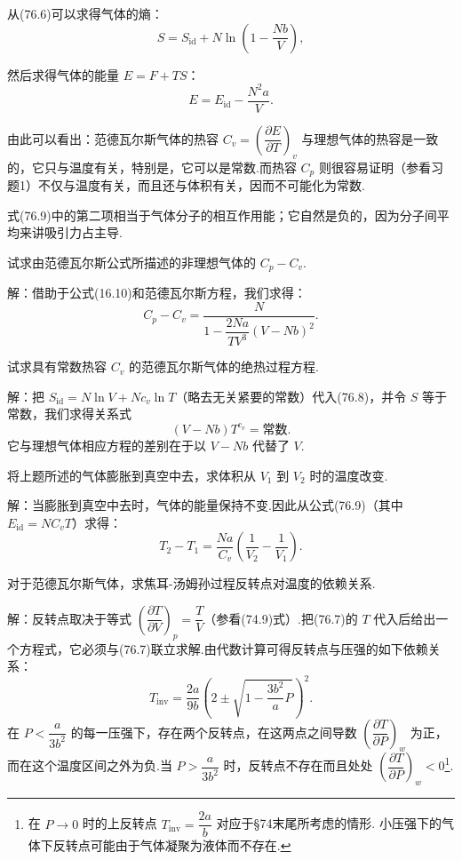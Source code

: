 从(76.6)可以求得气体的熵：
\begin{equation}
  S=S_{\mathrm{id}}+N\ln\left(1-\frac{Nb}{V}\right),
\end{equation}

然后求得气体的能量 $E=F+TS$：
\begin{equation}
  E=E_{\mathrm{id}}-\frac{N^2a}{V}.
\end{equation}

由此可以看出：范德瓦尔斯气体的热容 $C_v=\left(\dfrac{\partial E}{\partial T}\right)_v$ 与理想气体的热容是一致的，它只与温度有关，特别是，它可以是常数.而热容 $C_p$ 则很容易证明（参看习题1）不仅与温度有关，而且还与体积有关，因而不可能化为常数.

式(76.9)中的第二项相当于气体分子的相互作用能；它自然是负的，因为分子间平均来讲吸引力占主导.

\begin{xiti}

\quad 试求由范德瓦尔斯公式所描述的非理想气体的 $C_p-C_v$.

解：借助于公式(16.10)和范德瓦尔斯方程，我们求得：
\begin{equation*}
  C_p-C_v=\frac{N}{1-\dfrac{2Na}{TV^3}(V-Nb)^2}.
\end{equation*}

\quad 试求具有常数热容 $C_v$ 的范德瓦尔斯气体的绝热过程方程.

解：把 $S_{\mathrm{id}}=N\ln V+Nc_v\ln T$（略去无关紧要的常数）代入(76.8)，并令 $S$ 等于常数，我们求得关系式
\begin{equation*}
  (V-Nb)T^{c_v}=\text{常数}.
\end{equation*}
它与理想气体相应方程的差别在于以 $V-Nb$ 代替了 $V$.

\quad 将上题所述的气体膨胀到真空中去，求体积从 $V_1$ 到 $V_2$ 时的温度改变.

解：当膨胀到真空中去时，气体的能量保持不变.因此从公式(76.9)（其中 $E_{\mathrm{id}}=NC_vT$）求得：
\begin{equation*}
  T_2-T_1=\frac{Na}{C_v}\left(\frac{1}{V_2}-\frac{1}{V_1}\right).
\end{equation*}

\quad 对于范德瓦尔斯气体，求焦耳-汤姆孙过程反转点对温度的依赖关系.

解：反转点取决于等式 $\left(\dfrac{\partial T}{\partial V}\right)_p=\dfrac{T}{V}$（参看(74.9)式）.把(76.7)的 $T$ 代入后给出一个方程式，它必须与(76.7)联立求解.由代数计算可得反转点与压强的如下依赖关系：
\begin{equation*}
  T_{\mathrm{inv}}=\frac{2a}{9b}\left(2\pm\sqrt{1-\frac{3b^2}{a}P}\right)^2.
\end{equation*}
在 $P<\dfrac{a}{3b^2}$ 的每一压强下，存在两个反转点，在这两点之间导数 $\left(\dfrac{\partial T}{\partial P}\right)_w$ 为正，而在这个温度区间之外为负.当 $P>\dfrac{a}{3b^2}$ 时，反转点不存在而且处处 $\left(\dfrac{\partial T}{\partial P}\right)_w<0$\footnote{在 $P\to0$ 时的上反转点 $T_{\mathrm{inv}}=\dfrac{2a}{b}$ 对应于§74末尾所考虑的情形. 小压强下的气体下反转点可能由于气体凝聚为液体而不存在.}.

\end{xiti}

